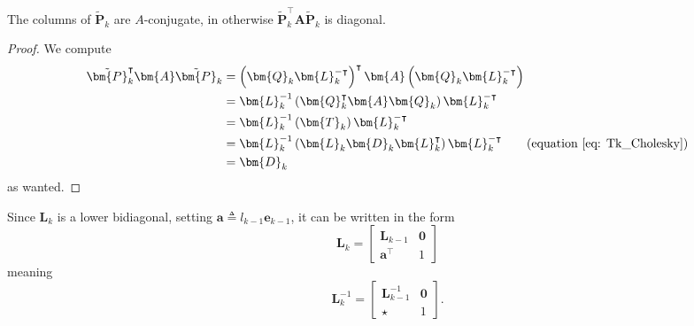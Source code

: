 \begin{lem} \label{lemma: Pk_cols_A_conj}
    The columns of $\tilde{\bm{P}}_k$ are $A$-conjugate, in otherwise $\tilde{\bm{P}}_k^{\intercal} \bm{A} \tilde{\bm{P}}_k$ is diagonal.
\end{lem}

\begin{proof}
    We compute
    \begin{align*}
        \tilde{\bm{P}}_k^{\intercal} \bm{A} \tilde{\bm{P}}_k & = \left( \bm{Q}_k \bm{L}_k^{-\intercal} \right)^{\intercal} \bm{A} \left( \bm{Q}_k \bm{L}_k^{-\intercal} \right)                 \\
                                                             & = \bm{L}_k^{-1} \left( \bm{Q}_k^{\intercal} \bm{A} \bm{Q}_k \right) \bm{L}_k^{-\intercal}                                        \\
                                                             & = \bm{L}_k^{-1} \left( \bm{T}_k \right) \bm{L}_k^{-\intercal}                                                                    \\
                                                             & = \bm{L}_k^{-1} \left( \bm{L}_k \bm{D}_k \bm{L}_k^{\intercal} \right) \bm{L}_k^{-\intercal} \tag{equation \ref{eq: Tk_Cholesky}} \\
                                                             & = \bm{D}_k
    \end{align*}
    as wanted.
\end{proof}

Since $\bm{L}_k$ is a lower bidiagonal, setting $\bm{a} \triangleq l_{k-1} \bm{e}_{k-1}$, it can be written in the form
\[
    \bm{L}_k =
    \begin{bmatrix}
        \bm{L}_{k-1}       & \bm{0} \\
        \bm{a}^{\intercal} & 1
    \end{bmatrix}
\]
meaning
\[
    \bm{L}_k^{-1} =
    \begin{bmatrix}
        \bm{L}_{k-1}^{-1} & \bm{0} \\
        \star             & 1
    \end{bmatrix}.
\]

